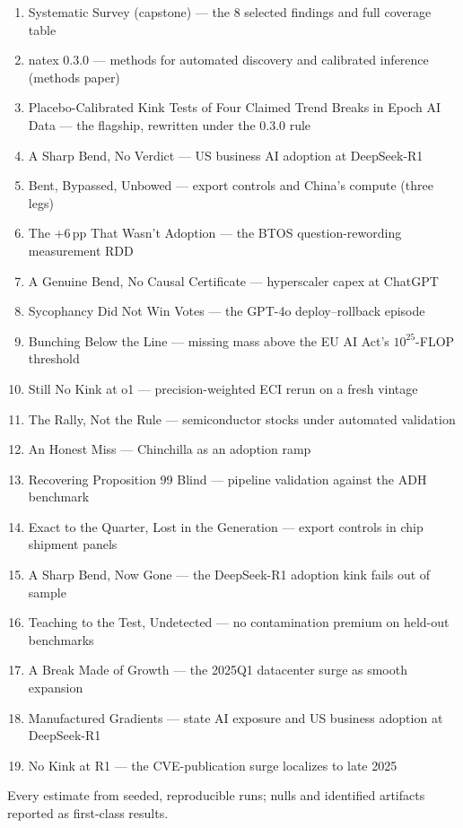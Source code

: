 \documentclass[11pt]{article}
\begin{document}
\begin{enumerate}\setlength{\itemsep}{1pt}
  \item Systematic Survey (capstone) --- the 8 selected findings and full coverage table
  \item natex 0.3.0 --- methods for automated discovery and calibrated inference (methods paper)
  \item Placebo-Calibrated Kink Tests of Four Claimed Trend Breaks in Epoch AI Data --- the flagship, rewritten under the 0.3.0 rule
  \item A Sharp Bend, No Verdict --- US business AI adoption at DeepSeek-R1
  \item Bent, Bypassed, Unbowed --- export controls and China's compute (three legs)
  \item The +6\,pp That Wasn't Adoption --- the BTOS question-rewording measurement RDD
  \item A Genuine Bend, No Causal Certificate --- hyperscaler capex at ChatGPT
  \item Sycophancy Did Not Win Votes --- the GPT-4o deploy--rollback episode
  \item Bunching Below the Line --- missing mass above the EU AI Act's $10^{25}$-FLOP threshold
  \item Still No Kink at o1 --- precision-weighted ECI rerun on a fresh vintage
  \item The Rally, Not the Rule --- semiconductor stocks under automated validation
  \item An Honest Miss --- Chinchilla as an adoption ramp
  \item Recovering Proposition 99 Blind --- pipeline validation against the ADH benchmark
  \item Exact to the Quarter, Lost in the Generation --- export controls in chip shipment panels
  \item A Sharp Bend, Now Gone --- the DeepSeek-R1 adoption kink fails out of sample
  \item Teaching to the Test, Undetected --- no contamination premium on held-out benchmarks
  \item A Break Made of Growth --- the 2025Q1 datacenter surge as smooth expansion
  \item Manufactured Gradients --- state AI exposure and US business adoption at DeepSeek-R1
  \item No Kink at R1 --- the CVE-publication surge localizes to late 2025
\end{enumerate}
\vfill
\begin{center}\small Every estimate from seeded, reproducible runs; nulls and identified artifacts reported as first-class results.\end{center}
\end{document}
